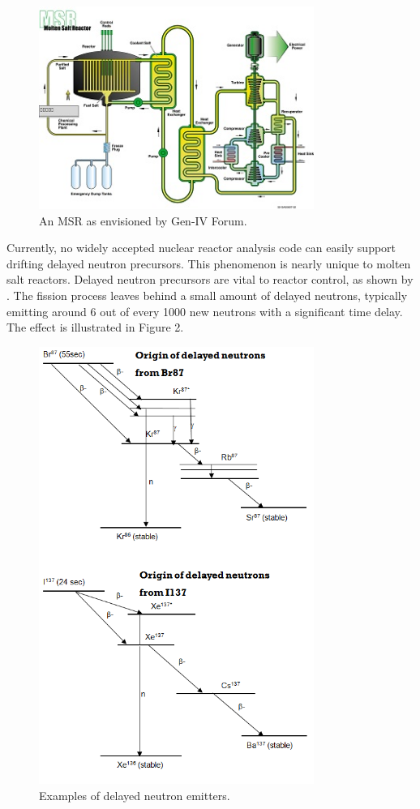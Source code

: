\begin{figure}
\includegraphics[width=0.8\textwidth]{gifmsr}
\caption{An MSR as envisioned by Gen-IV Forum.}
\label{fig:gifmsr}
\end{figure}

Currently, no widely accepted nuclear reactor analysis code can easily support drifting delayed neutron precursors. This phenomenon is nearly unique to molten salt reactors. Delayed neutron precursors are vital to reactor control, as shown by \cite[Ch. 6]{duderstadt_nuclear_1976}. The fission process leaves behind a small amount of delayed neutrons, typically emitting around 6 out of every 1000 new neutrons with a significant time delay. The effect is illustrated in Figure 2.

\begin{figure}
\includegraphics[width=0.8\textwidth]{dnp}
\caption{Examples of delayed neutron emitters.}
\label{fig:dnps}
\end{figure}

